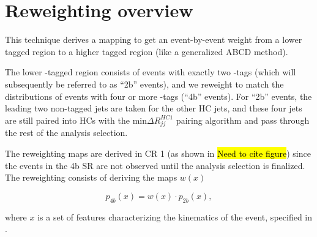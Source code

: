 \section{Reweighting overview}
\label{sec:rw-overview}

This technique derives a mapping to get an event-by-event weight from a lower tagged region to a higher tagged region (like a generalized ABCD method).

The lower \Pqb-tagged region consists of events with exactly two \Pqb-tags (which will subsequently be referred to as ``2b\Pqb'' events), and we reweight to match the distributions of events with four or more \Pqb-tags (``4b\Pqb'' events).  For ``2b\Pqb'' events, the leading two non-\Pqb tagged jets are taken for the other HC jets, and these four jets are still paired into HCs with the $\text{min} \Delta R_{jj}^{HC 1}$ pairing algorithm and pass through the rest of the analysis selection.

The reweighting maps are derived in CR 1 (as shown in \hl{Need to cite figure}) since the events in the 4b SR are not observed until the analysis selection is finalized. 
The reweighting consists of deriving the maps $w(x)$

\begin{equation}
	p_{4b}(x) = w(x) \cdot p_{2b}(x),
\end{equation}

where $x$ is a set of features characterizing the kinematics of the event, specified in \Tab{\ref{tab:rw-inputs}}.

\def\checkmark{\tikz\fill[scale=0.4](0,.35) -- (.25,0) -- (1,.7) -- (.25,.15) -- cycle;}
\renewcommand{\arraystretch}{1.2}

